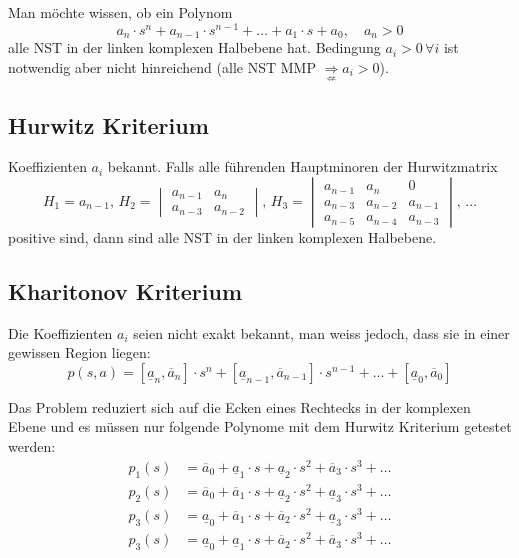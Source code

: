 Man möchte wissen, ob ein Polynom
\begin{equation*}
    a_n\cdot s^n + a_{n-1}\cdot s^{n-1} + \dots + a_1\cdot s + a_0,\quad a_n > 0
\end{equation*}
alle NST in der linken komplexen Halbebene hat. Bedingung $a_i>0\, \forall i$ ist notwendig aber nicht hinreichend \Big(alle  NST MMP $\underset{\not\Leftarrow}{\Rightarrow} a_i > 0$\Big).

\subsection{Hurwitz Kriterium}
    Koeffizienten $a_i$ bekannt. Falls alle führenden Hauptminoren der Hurwitzmatrix
    \begin{equation*}
        H_1 = a_{n-1}, \,
        H_2 =
        \begin{vmatrix}
            a_{n-1} & a_n\\
            a_{n-3} & a_{n-2}
        \end{vmatrix}, \,
        H_3 = 
        \begin{vmatrix}
            a_{n-1} & a_n   & 0\\
            a_{n-3} & a_{n-2} & a_{n-1}\\
            a_{n-5} & a_{n-4} & a_{n-3}
        \end{vmatrix}, \, \dots
    \end{equation*}
    positive sind, dann sind alle NST in der linken komplexen Halbebene. %
    
\subsection{Kharitonov Kriterium}
    Die Koeffizienten $a_i$ seien nicht exakt bekannt, man weiss jedoch, dass sie in einer gewissen Region liegen:
    \begin{equation*}
        p(s,a) = [\underline{a}_n,\overline{a}_n]\cdot s^n +  [\underline{a}_{n-1},\overline{a}_{n-1}]\cdot s^{n-1} + \dots +  [\underline{a}_0,\overline{a}_0]
    \end{equation*}
    
    Das Problem reduziert sich auf die Ecken eines Rechtecks in der komplexen Ebene und es müssen nur folgende Polynome mit dem Hurwitz Kriterium getestet werden:
    \begin{align*}
        p_1(s) &= \overline{a}_0 + \underline{a}_1\cdot s +\underline{a}_2\cdot s^2 + \overline{a}_3\cdot s^3 + \dots\\
        p_2(s) &= \overline{a}_0 + \overline{a}_1\cdot s +\underline{a}_2\cdot s^2 + \underline{a}_3\cdot s^3 + \dots\\
        p_3(s) &= \underline{a}_0 + \overline{a}_1\cdot s +\overline{a}_2\cdot s^2 + \underline{a}_3\cdot s^3 + \dots\\
        p_3(s) &= \underline{a}_0 + \underline{a}_1\cdot s +\overline{a}_2\cdot s^2 + \overline{a}_3\cdot s^3 + \dots\\
    \end{align*}